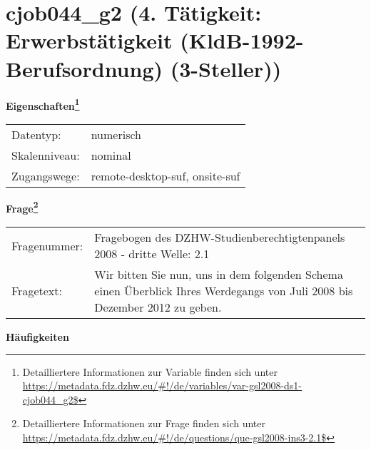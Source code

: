 
    \setcounter{footnote}{0}

    \vspace*{-1.8cm}
	\section{cjob044\_g2 (4. Tätigkeit: Erwerbstätigkeit (KldB-1992-Berufsordnung) (3-Steller))}
	\label{section:cjob044_g2}



    \vspace*{0.5cm}
    \noindent\textbf{Eigenschaften\footnote{Detailliertere Informationen zur Variable finden sich unter
		\url{https://metadata.fdz.dzhw.eu/\#!/de/variables/var-gsl2008-ds1-cjob044_g2$}}}\\
	\begin{tabularx}{\hsize}{@{}lX}
	Datentyp: & numerisch \\
	Skalenniveau: & nominal \\
	Zugangswege: &
	  remote-desktop-suf, 
	  onsite-suf
 \\
    \end{tabularx}



				\vspace*{0.5cm}
                \noindent\textbf{Frage\footnote{Detailliertere Informationen zur Frage finden sich unter
		              \url{https://metadata.fdz.dzhw.eu/\#!/de/questions/que-gsl2008-ins3-2.1$}}}\\
				\begin{tabularx}{\hsize}{@{}lX}
					Fragenummer: &
					  Fragebogen des DZHW-Studienberechtigtenpanels 2008 - dritte Welle:
					  2.1
 \\
					Fragetext: & Wir bitten Sie nun, uns in dem folgenden Schema einen Überblick Ihres Werdegangs von Juli 2008 bis Dezember 2012 zu geben. \\
				\end{tabularx}





        		\vspace*{0.5cm}
                \noindent\textbf{Häufigkeiten}

